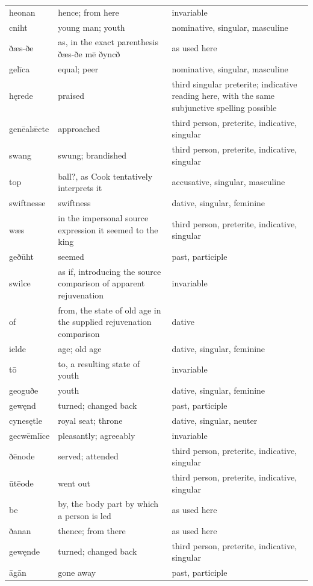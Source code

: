 \begin{longtable}{@{}>{\raggedright\arraybackslash}p{26mm}>{\raggedright\arraybackslash}p{44.5mm}>{\raggedright\arraybackslash}p{47.88mm}@{}}
heonan & hence; from here & invariable \\
cniht & young man; youth & nominative, singular, masculine \\
ðæs-ðe & as, in the exact parenthesis ðæs-ðe mē ðyncð & as used here \\
gelīca & equal; peer & nominative, singular, masculine \\
hęrede & praised & third singular preterite; indicative reading here, with the same subjunctive spelling possible \\
genēalǣcte & approached & third person, preterite, indicative, singular \\
swang & swung; brandished & third person, preterite, indicative, singular \\
top & ball?, as Cook tentatively interprets it & accusative, singular, masculine \\
swiftnesse & swiftness & dative, singular, feminine \\
wæs & in the impersonal source expression it seemed to the king & third person, preterite, indicative, singular \\
geðūht & seemed & past, participle \\
swilce & as if, introducing the source comparison of apparent rejuvenation & invariable \\
of & from, the state of old age in the supplied rejuvenation comparison & dative \\
ielde & age; old age & dative, singular, feminine \\
tō & to, a resulting state of youth & invariable \\
geoguðe & youth & dative, singular, feminine \\
gewęnd & turned; changed back & past, participle \\
cynesętle & royal seat; throne & dative, singular, neuter \\
gecwēmlīce & pleasantly; agreeably & invariable \\
ðēnode & served; attended & third person, preterite, indicative, singular \\
ūtēode & went out & third person, preterite, indicative, singular \\
be & by, the body part by which a person is led & as used here \\
ðanan & thence; from there & as used here \\
gewęnde & turned; changed back & third person, preterite, indicative, singular \\
āgān & gone away & past, participle \\

\end{longtable}
